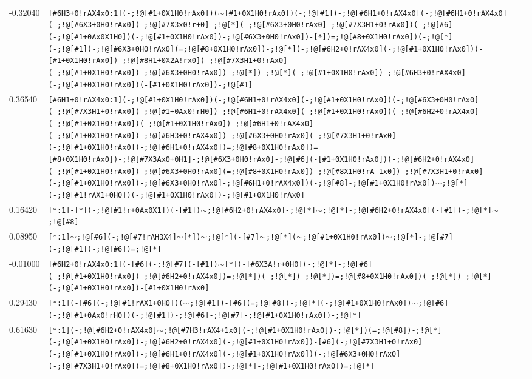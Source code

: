 \begin{longtable}{>{\baselineskip=10pt}p{} >{\baselineskip=10pt}p{}}
-0.32040 & \texttt{[\#6H3+0!rAX4x0:1](-;!@[\#1+0X1H0!rAx0])($\sim$[\#1+0X1H0!rAx0])(-;!@[\#1])-;!@[\#6H1+0!rAX4x0](-;!@[\#6H1+0!rAX4x0](-;!@[\#6X3+0H0!rAx0](-;!@[\#7X3x0!r+0]-;!@[*](-;!@[\#6X3+0H0!rAx0]-;!@[\#7X3H1+0!rAx0])(-;!@[\#6](-;!@[\#1+0Ax0X1H0])(-;!@[\#1+0X1H0!rAx0])-;!@[\#6X3+0H0!rAx0])-[*])=;!@[\#8+0X1H0!rAx0])(-;!@[*](-;!@[\#1])-;!@[\#6X3+0H0!rAx0](=;!@[\#8+0X1H0!rAx0])-;!@[*](-;!@[\#6H2+0!rAX4x0](-;!@[\#1+0X1H0!rAx0])(-[\#1+0X1H0!rAx0])-;!@[\#8H1+0X2A!rx0])-;!@[\#7X3H1+0!rAx0](-;!@[\#1+0X1H0!rAx0])-;!@[\#6X3+0H0!rAx0])-;!@[*])-;!@[*](-;!@[\#1+0X1H0!rAx0])-;!@[\#6H3+0!rAX4x0](-;!@[\#1+0X1H0!rAx0])(-[\#1+0X1H0!rAx0])-;!@[\#1]} \\ 
0.36540 & \texttt{[\#6H1+0!rAX4x0:1](-;!@[\#1+0X1H0!rAx0])(-;!@[\#6H1+0!rAX4x0](-;!@[\#1+0X1H0!rAx0])(-;!@[\#6X3+0H0!rAx0](-;!@[\#7X3H1+0!rAx0](-;!@[\#1+0Ax0!rH0])-;!@[\#6H1+0!rAX4x0](-;!@[\#1+0X1H0!rAx0])(-;!@[\#6H2+0!rAX4x0](-;!@[\#1+0X1H0!rAx0])(-;!@[\#1+0X1H0!rAx0])-;!@[\#6H1+0!rAX4x0](-;!@[\#1+0X1H0!rAx0])-;!@[\#6H3+0!rAX4x0])-;!@[\#6X3+0H0!rAx0](-;!@[\#7X3H1+0!rAx0](-;!@[\#1+0X1H0!rAx0])-;!@[\#6H1+0!rAX4x0])=;!@[\#8+0X1H0!rAx0])=[\#8+0X1H0!rAx0])-;!@[\#7X3Ax0+0H1]-;!@[\#6X3+0H0!rAx0]-;!@[\#6](-[\#1+0X1H0!rAx0])(-;!@[\#6H2+0!rAX4x0](-;!@[\#1+0X1H0!rAx0])-;!@[\#6X3+0H0!rAx0](=;!@[\#8+0X1H0!rAx0])-;!@[\#8X1H0!rA-1x0])-;!@[\#7X3H1+0!rAx0](-;!@[\#1+0X1H0!rAx0])-;!@[\#6X3+0H0!rAx0]-;!@[\#6H1+0!rAX4x0])(-;!@[\#8]-;!@[\#1+0X1H0!rAx0])$\sim$;!@[*](-;!@[\#1!rAX1+0H0])(-;!@[\#1+0X1H0!rAx0])-;!@[\#1+0X1H0!rAx0]} \\ 
0.16420 & \texttt{[*:1]-[*](-;!@[\#1!r+0Ax0X1])(-[\#1])$\sim$;!@[\#6H2+0!rAX4x0]-;!@[*]$\sim$;!@[*]-;!@[\#6H2+0!rAX4x0](-[\#1])-;!@[*]$\sim$;!@[\#8]} \\ 
0.08950 & \texttt{[*:1]$\sim$;!@[\#6](-;!@[\#7!rAH3X4]$\sim$[*])$\sim$;!@[*](-[\#7]$\sim$;!@[*]($\sim$;!@[\#1+0X1H0!rAx0])$\sim$;!@[*]-;!@[\#7](-;!@[\#1])-;!@[\#6])=;!@[*]} \\ 
-0.01000 & \texttt{[\#6H2+0!rAX4x0:1](-[\#6](-;!@[\#7](-[\#1])$\sim$[*](-[\#6X3A!r+0H0](-;!@[*]-;!@[\#6](-;!@[\#1+0X1H0!rAx0])-;!@[\#6H2+0!rAX4x0])=;!@[*])(-;!@[*])-;!@[*])=;!@[\#8+0X1H0!rAx0])(-;!@[*])-;!@[*](-;!@[\#1+0X1H0!rAx0])-[\#1+0X1H0!rAx0]} \\ 
0.29430 & \texttt{[*:1](-[\#6](-;!@[\#1!rAX1+0H0])($\sim$;!@[\#1])-[\#6](=;!@[\#8])-;!@[*](-;!@[\#1+0X1H0!rAx0])$\sim$;!@[\#6](-;!@[\#1+0Ax0!rH0])(-;!@[\#1])-;!@[\#6]-;!@[\#7]-;!@[\#1+0X1H0!rAx0])-;!@[*]} \\ 
0.61630 & \texttt{[*:1](-;!@[\#6H2+0!rAX4x0]$\sim$;!@[\#7H3!rAX4+1x0](-;!@[\#1+0X1H0!rAx0])-;!@[*])(=;!@[\#8])-;!@[*](-;!@[\#1+0X1H0!rAx0])-;!@[\#6H2+0!rAX4x0](-;!@[\#1+0X1H0!rAx0])-[\#6](-;!@[\#7X3H1+0!rAx0](-;!@[\#1+0X1H0!rAx0])-;!@[\#6H1+0!rAX4x0](-;!@[\#1+0X1H0!rAx0])(-;!@[\#6X3+0H0!rAx0](-;!@[\#7X3H1+0!rAx0])=;!@[\#8+0X1H0!rAx0])-;!@[*]-;!@[\#1+0X1H0!rAx0])=;!@[*]} \\ 

\end{longtable}
